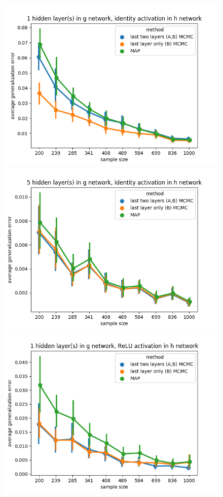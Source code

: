 \documentclass[11pt]{article}
\numberwithin{equation}{section}
\theoremstyle{plain}
\theoremstyle{definition}
\begin{document}
\begin{figure}[h!]
	\begin{center}
		\includegraphics[scale=0.45]{taskid8.png}
		\includegraphics[scale=0.45]{taskid9.png}
		\includegraphics[scale=0.45]{taskid10.png}

\end{center}
\end{figure}
\end{document}
